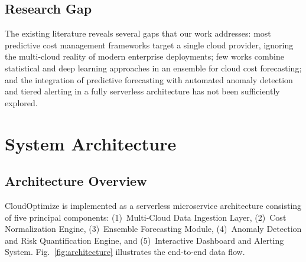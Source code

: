 \documentclass[conference]{IEEEtran}
\begin{document}
\subsection{Research Gap}

The existing literature reveals several gaps that our work addresses: most predictive cost management frameworks target a single cloud provider, ignoring the multi-cloud reality of modern enterprise deployments; few works combine statistical and deep learning approaches in an ensemble for cloud cost forecasting; and the integration of predictive forecasting with automated anomaly detection and tiered alerting in a fully serverless architecture has not been sufficiently explored.

\section{System Architecture}
\label{sec:architecture}

\subsection{Architecture Overview}

CloudOptimize is implemented as a serverless microservice architecture consisting of five principal components: (1)~Multi-Cloud Data Ingestion Layer, (2)~Cost Normalization Engine, (3)~Ensemble Forecasting Module, (4)~Anomaly Detection and Risk Quantification Engine, and (5)~Interactive Dashboard and Alerting System. Fig.~\ref{fig:architecture} illustrates the end-to-end data flow.
\end{document}
